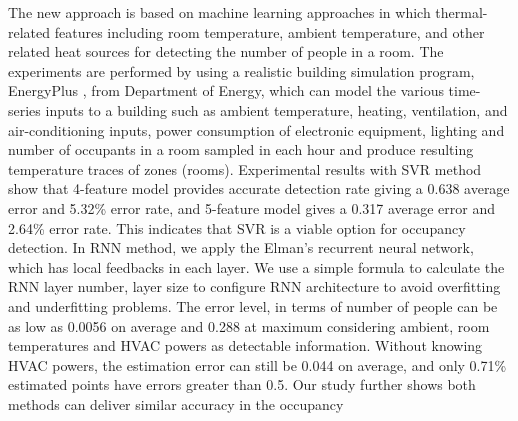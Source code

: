 \textcolor{feb18rev}{The new approach is based on machine learning
  approaches in which thermal-related features including room
  temperature, ambient temperature, and other related heat sources for
  detecting the number of people in a room.  The experiments are
  performed by using a realistic building simulation program,
  EnergyPlus \cite{energyplus:2001vf}, from Department of Energy,
  which can model the various time-series inputs to a building such as
  ambient temperature, heating, ventilation, and air-conditioning
  inputs, power consumption of electronic equipment, lighting and
  number of occupants in a room sampled in each hour and produce
  resulting temperature traces of zones (rooms).}  Experimental
results with SVR method show that 4-feature model provides accurate
detection rate giving a 0.638 average error and 5.32\% error rate, and
5-feature model gives a 0.317 average error and 2.64\% error
rate. This indicates that SVR is a viable option for occupancy
detection.  In RNN method, we apply the Elman's recurrent neural
network, which has local feedbacks in each layer. We use a simple
formula to calculate the RNN layer number, layer size to configure RNN
architecture to avoid overfitting and underfitting problems. The error
level, in terms of number of people can be as low as 0.0056 on average
and 0.288 at maximum considering ambient, room temperatures and HVAC
powers as detectable information. Without knowing HVAC powers, the
estimation error can still be 0.044 on average, and only 0.71\%
estimated points have errors greater than 0.5. Our study further shows
both methods can deliver similar accuracy in the occupancy
